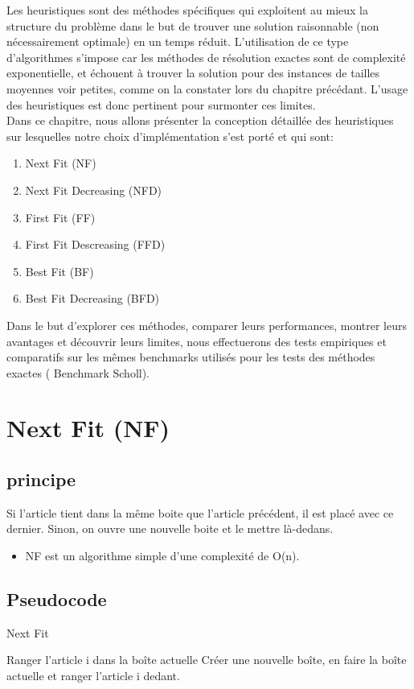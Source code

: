 \documentclass[12pt]{article}
\begin{document}
\setcounter{section}{0}
Les heuristiques sont des méthodes spécifiques qui exploitent au mieux la structure du 
problème dans le but de trouver une solution raisonnable (non nécessairement optimale) en un temps réduit. 
L’utilisation de ce type d’algorithmes s'impose car les méthodes de résolution exactes sont 
de complexité exponentielle, et échouent à trouver la solution pour des instances de tailles moyennes voir petites,
 comme on la constater lors du chapitre précédant. 
L'usage des heuristiques est donc pertinent pour surmonter ces limites.\\

Dans ce chapitre, nous allons présenter la conception détaillée des heuristiques sur lesquelles notre choix d’implémentation s’est porté et qui sont:
\begin{enumerate}
    \item Next Fit (NF)
    \item Next Fit Decreasing (NFD)
    \item First Fit (FF)
    \item First Fit Descreasing (FFD)
    \item Best Fit (BF)
    \item Best Fit Decreasing (BFD)\\
\end{enumerate}

Dans le but d’explorer ces méthodes, comparer leurs performances, montrer leurs avantages et découvrir leurs limites, nous effectuerons des tests empiriques et comparatifs sur les mêmes  benchmarks utilisés pour les tests des méthodes exactes ( Benchmark Scholl).
\newpage
\section{Next Fit (NF)}
\subsection{principe}
Si l’article tient dans la même boite que l’article précédent, il est placé avec ce dernier. Sinon, on ouvre une nouvelle boite et le mettre là-dedans.
\begin{itemize}
    \item NF est un algorithme simple d’une complexité de O(n). 
\end{itemize}

\subsection{Pseudocode}
\begin{algorithm}[!h]
    \caption{Next Fit}
    \begin{algorithmic}
            \STATE Ranger l’article i dans la boîte actuelle
        \ELSE 
            \STATE Créer une nouvelle boîte, en faire la boîte actuelle et ranger l'article i dedant.
        \ENDIF
    \ENDFOR
    \end{algorithmic}
\end{algorithm}
\end{document}
